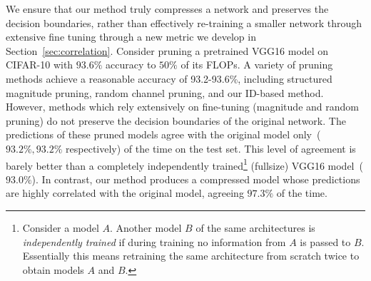 
We ensure that our method truly compresses a network and preserves the decision boundaries, rather than effectively re-training a smaller network through extensive fine tuning through a new metric we develop in Section~\ref{sec:correlation}.  
Consider pruning a pretrained VGG16 model on CIFAR-10 with $93.6\%$ accuracy to $50\%$ of its FLOPs.
A variety of pruning methods achieve a reasonable accuracy of 93.2-93.6\%, including structured magnitude pruning, random channel pruning, and our ID-based method.  
However, methods which rely extensively on fine-tuning (magnitude and random pruning) do not preserve the decision boundaries of the original network.  
The predictions of these pruned models agree with the original model only~($93.2\%, 93.2\%$ respectively) of the time on the test set.
This level of agreement is barely better than a completely independently trained\footnote{
Consider a model $A$.
Another model $B$ of the same architectures is \emph{independently trained} if during training no information from $A$ is passed to $B$.
Essentially this means retraining the same architecture from scratch twice to obtain models $A$ and $B$.
}
(fullsize) VGG16 model~($93.0\%$).
In contrast, our method produces a compressed model whose predictions are highly correlated with the original model, agreeing $97.3\%$ of the time.


